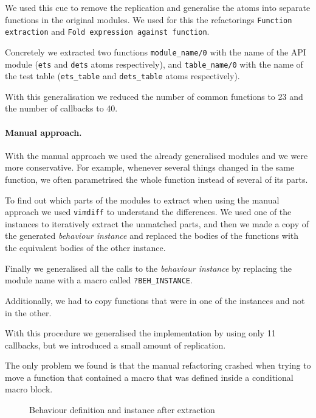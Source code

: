 We used this cue to remove the replication and generalise the atoms into 
separate functions in the original modules. We used for this the refactorings 
\texttt{Function extraction} and \texttt{Fold expression against function}.

Concretely we extracted two functions \texttt{module\_name/0} with 
the name of the API module (\texttt{ets} and \texttt{dets} atoms respectively), 
and \texttt{table\_name/0} with the name of the test table (\texttt{ets\_table} 
and \texttt{dets\_table} atoms respectively).

With this generalisation we reduced the number of common functions to 23 and 
the number of callbacks to 40.

\paragraph{Manual approach.}

With the manual approach we used the already generalised modules and we were 
more conservative. For example, whenever several things changed in the same 
function, we often parametrised the whole function instead of several of its 
parts.

To find out which parts of the modules to extract when using the manual 
approach we used \texttt{vimdiff} to understand the differences. We used one of 
the instances to iteratively extract the unmatched parts, and then we made a 
copy of the generated \emph{behaviour instance} and replaced the bodies of the 
functions with the equivalent bodies of the other instance.

Finally we generalised all the calls to the \emph{behaviour instance} by 
replacing the module name with a macro called \texttt{?BEH\_INSTANCE}.

Additionally, we had to copy functions that were in one of the instances
and not in the other.

With this procedure we generalised the implementation by using only 11 
callbacks, but we introduced a small amount of replication.

The only problem we found is that the manual refactoring crashed when trying to 
move a function that contained a macro that was defined inside a conditional 
macro block.

\begin{figure}[t]
%
\vspace*{-2.5mm}
\caption{Behaviour definition and instance after extraction\label{fig:auto-abs}}
\end{figure}

